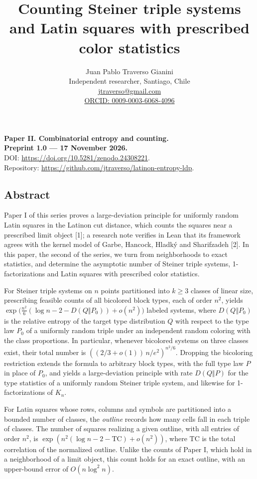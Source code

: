 \documentclass[english,11pt,a4paper]{article}
\title{Counting Steiner triple systems and Latin squares with prescribed color statistics}
\author{Juan Pablo Traverso Gianini\\\small Independent researcher, Santiago, Chile\\\small \href{mailto:jtraverso@gmail.com}{jtraverso@gmail.com}\\\small \href{https://orcid.org/0009-0003-6068-4096}{ORCID: 0009-0003-6068-4096}}
\date{}
\begin{document}
\raggedbottom\maketitle
\begin{center}
\textbf{Paper II. Combinatorial entropy and counting.}\\
\textbf{Preprint 1.0 --- 17 November 2026.}\\
DOI: \url{https://doi.org/10.5281/zenodo.24308221}.\\
Repository: \url{https://github.com/jtraverso/latinon-entropy-ldp}.
\end{center}

\subsection{Abstract}\label{abstract}

Paper I of this series proves a large-deviation principle for uniformly random Latin squares in the Latinon cut distance, which counts the squares near a prescribed limit object {[}1{]}; a research note verifies in Lean that its framework agrees with the kernel model of Garbe, Hancock, Hladký and Sharifzadeh {[}2{]}. In this paper, the second of the series, we turn from neighborhoods to exact statistics, and determine the asymptotic number of Steiner triple systems, 1-factorizations and Latin squares with prescribed color statistics.

For Steiner triple systems on \(n\) points partitioned into \(k\ge3\) classes of linear size, prescribing feasible counts of all bicolored block types, each of order \(n^2\), yields \(\exp\bigl(\frac{n^2}{6}(\log n-2-D(Q\Vert P_0))+o(n^2)\bigr)\) labeled systems, where \(D(Q\Vert P_0)\) is the relative entropy of the target type distribution \(Q\) with respect to the type law \(P_0\) of a uniformly random triple under an independent random coloring with the class proportions. In particular, whenever bicolored systems on three classes exist, their total number is \(((2/3+o(1))\,n/e^2)^{n^2/6}\). Dropping the bicoloring restriction extends the formula to arbitrary block types, with the full type law \(P\) in place of \(P_0\), and yields a large-deviation principle with rate \(D(Q\Vert P)\) for the type statistics of a uniformly random Steiner triple system, and likewise for 1-factorizations of \(K_n\).

For Latin squares whose rows, columns and symbols are partitioned into a bounded number of classes, the \emph{outline} records how many cells fall in each triple of classes. The number of squares realizing a given outline, with all entries of order \(n^2\), is \(\exp(n^2(\log n-2-\mathrm{TC})+o(n^2))\), where \(\mathrm{TC}\) is the total correlation of the normalized outline. Unlike the counts of Paper I, which hold in a neighborhood of a limit object, this count holds for an exact outline, with an upper-bound error of \(O(n\log^2 n)\).
\end{document}
